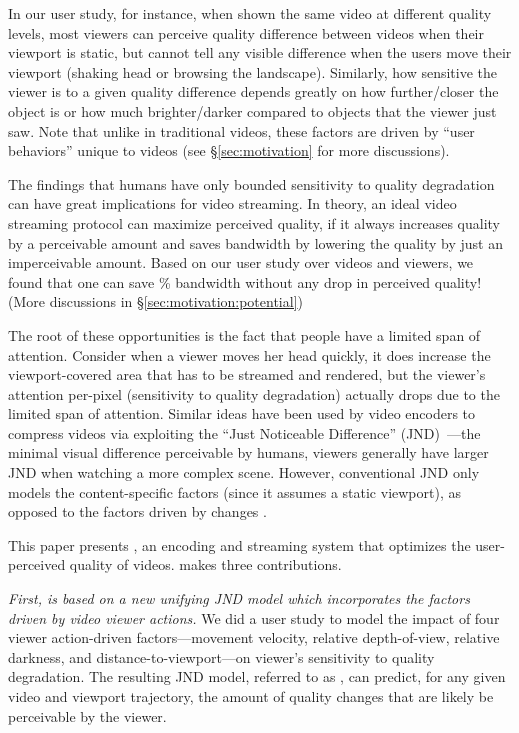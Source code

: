 In our user study, for instance, when shown the same video at different quality levels, most viewers can perceive quality difference between videos when their viewport is static, but cannot tell any visible difference when the users move their viewport (\eg shaking head or browsing the landscape).
Similarly, how sensitive the viewer is to a given quality difference depends greatly on how further/closer the object is or how much brighter/darker compared to objects that the viewer just saw.
Note that unlike in traditional videos, these factors are driven by ``user behaviors'' unique to \vr videos (see \S\ref{sec:motivation} for more discussions).


The findings that humans have only bounded sensitivity to quality degradation can have great implications for \vr video streaming. 
In theory, an ideal video streaming protocol can maximize perceived quality, if it always increases quality by a perceivable amount and saves bandwidth by lowering the quality by just an imperceivable amount. 
Based on our user study over \fillme videos and \fillme viewers, we found that one can save \fillme\% bandwidth without any drop in perceived quality! (More discussions in \S\ref{sec:motivation:potential})


The root of these opportunities is the fact that people have a limited span of attention.
Consider when a viewer moves her head quickly, it does increase the viewport-covered area that has to be streamed and rendered, but the viewer's attention per-pixel (\ie sensitivity to quality degradation) actually drops due to the limited span of attention.
Similar ideas have been used by video encoders to compress videos via exploiting the ``Just Noticeable Difference'' (JND)~\cite{??,??,??}---the minimal visual difference perceivable by humans, \eg viewers generally have larger JND when watching a more complex scene. 
However, conventional JND only models the content-specific factors (since it assumes a static viewport), as opposed to the factors driven by changes . 

This paper presents {\em \name}, an encoding and streaming system that optimizes the user-perceived quality of \vr videos. 
\name makes three contributions.

\vspace{0.2cm}
{\em First, \name is based on a new unifying JND model which incorporates the factors driven by \vr video viewer actions.}
We did a user study to model the impact of four viewer action-driven factors---movement velocity, relative depth-of-view, relative darkness, and distance-to-viewport---on viewer's sensitivity to quality degradation.
The resulting JND model, referred to as {\em \vrjnd}, can predict, for any given video and viewport trajectory, the amount of quality changes  that are likely be perceivable by the viewer.

